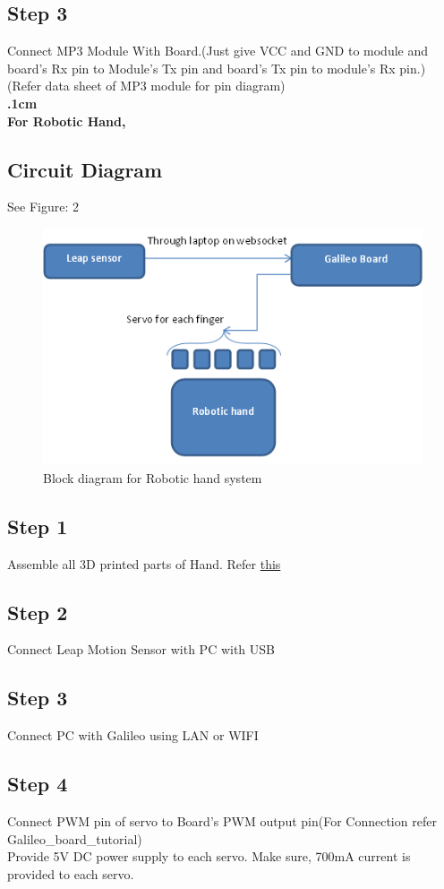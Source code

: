 \documentclass[a4paper,12pt,oneside]{book}
\begin{document}
\subsection*{Step 3}
Connect MP3 Module With Board.(Just give VCC and GND to module and board's Rx pin to Module's Tx pin and board's Tx pin to module's Rx pin.)(Refer data sheet of MP3 module for pin diagram)\\
\textbf{.1cm}\\
\textbf{For Robotic Hand,}
\subsection*{Circuit Diagram}
See Figure: 2
\begin{figure}
  \includegraphics[width=\linewidth]{2.png}
  \caption{Block diagram for Robotic hand system}
\end{figure}
\subsection*{Step 1}
Assemble all 3D printed parts of Hand. Refer \href{http://inmoov.fr/hand-and-forarm/}{this}
\subsection*{Step 2}
Connect Leap Motion Sensor with PC with USB
\subsection*{Step 3}
Connect PC with Galileo using LAN or WIFI
\subsection*{Step 4}
Connect PWM pin of servo to Board's PWM output pin(For Connection refer Galileo\_board\_tutorial)\\
Provide 5V DC power supply to each servo. Make sure, 700mA current is provided to each servo.
\end{document}
